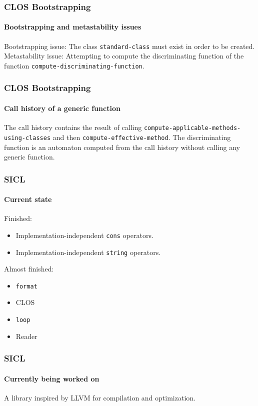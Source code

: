 \documentclass{beamer}
\begin{document}
\begin{frame}
  \frametitle{CLOS Bootstrapping}
  \framesubtitle{Bootstrapping and metastability issues}

Bootstrapping issue: The class \texttt{standard-class} must exist in
order to be created.
\vskip 0.25cm
Metastability issue: Attempting to compute the discriminating function
of the function \texttt{compute-discriminating-function}.

\end{frame}
\begin{frame}
  \frametitle{CLOS Bootstrapping}
  \framesubtitle{Call history of a generic function}

The call history contains the result of calling
\texttt{compute-applicable-methods-using-classes} and then
\texttt{compute-effective-method}.
\vskip 0.25cm
The discriminating function is an automaton computed from the call
history without calling any generic function.

\end{frame}
\begin{frame}
  \frametitle{SICL}
  \framesubtitle{Current state}
Finished:
\vskip 0.25cm
\begin{itemize}
\item Implementation-independent \texttt{cons} operators. 
\item Implementation-independent \texttt{string} operators.
\end{itemize}
\vskip 0.5cm
Almost finished:
\vskip 0.25cm
\begin{itemize}
\item \texttt{format}
\item CLOS
\item \texttt{loop}
\item Reader
\end{itemize}

\end{frame}
\begin{frame}
  \frametitle{SICL}
  \framesubtitle{Currently being worked on}

A library inspired by LLVM for compilation and optimization. 

\end{frame}
\end{document}
